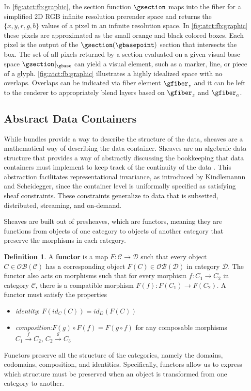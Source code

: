 \documentclass[10pt,journal,compsoc]{IEEEtran}
\theoremstyle{definition}
\newtheorem{definition}{Definition}[section]
\theoremstyle{remark}
\begin{document}
In \autoref{fig:atct:fb:graphic}, the section function $\gsection$ maps into the fiber for a simplified 2D RGB infinite resolution prerender space and returns the $\{x,y,r,g,b\}$ values of a pixel in an infinite resolution space. In \autoref{fig:atct:fb:graphic} these pixels are approximated as the small orange and black colored boxes. Each pixel is the output of the $\gsection(\gbasepoint)$ section that intersects the box. The set of all pixels returned by a section evaluated on a given visual base space $\gsection|_{\gbase}$ can yield a visual element, such as a marker, line, or piece of a glyph. \autoref{fig:atct:fb:graphic} illustrates a highly idealized space with no overlaps. Overlaps can be indicated via fiber element $\gfiber_{z}$ and it can be left to the renderer to appropriately blend layers based on $\gfiber_{z}$ and $\gfiber_{a}$. 

\subsection{Abstract Data Containers}
\label{sec:atct:sheaves}
While bundles provide a way to describe the structure of the data, sheaves are a mathematical way of describing the data container. Sheaves are an algebraic data structure that provides a way of abstractly discussing the bookkeeping that data containers must implement to keep track of the continuity of the data \cite{ghristElementaryAppliedTopology2014}. This abstraction facilitates representational invariance, as introduced by Kindlemannn and Scheidegger\cite{kindlmannAlgebraicProcessVisualization2014}, since the container level is uniformally specified as satisfying sheaf constraints. These constraints generalize to data that is subsetted, distributed, streaming, and on-demand. 

Sheaves are built out of presheaves, which are functors, meaning they are functions from objects of one category to objects of another category\cite{bradleyWhatFunctorDefinitions} that preserve the morphisms in each category. 
\begin{definition} A \textbf{functor} is a map $F: \mathcal{C} \rightarrow \mathcal{D}$ such that every object $C \in \mathcal{OB(C)}$ has a corresponding object $F(C) \in \mathcal{OB(D)}$ in category $\mathcal{D}$. The functor also acts on morphisms such that for every morphism $f: C_1 \rightarrow C_2$ in category $\mathcal{C}$, there is a compatible morphism $F(f): F(C_{1}) \rightarrow F(C_2)$. 
A functor must satisfy the properties 
\begin{itemize}
  \item \textit{identity}: $F(id_{C}(C)) = id_{D}(F(C))$
  \item \textit{composition}:$F(g)\circ F(f) = F(g\circ f)$ for any composable morphisms $C_{1}\xrightarrow{f} C_2$, $C_2 \xrightarrow{g} C_3$
\end{itemize}
\end{definition}
Functors preserve all the structure of the categories, namely the domains, codomains, composition, and identities\cite{riehlCategoryTheoryContext}. Specifically, functors allow us to express which structure must be preserved when an object is transformed from one category to another. 
\end{document}
